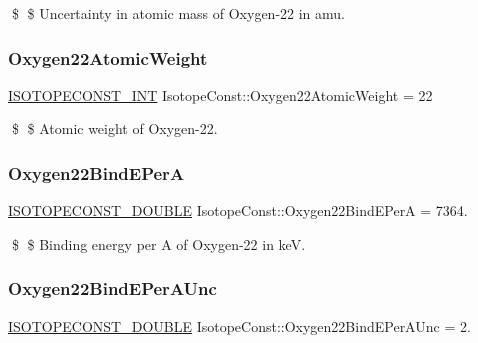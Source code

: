 \$ \$ Uncertainty in atomic mass of Oxygen-\/22 in amu. \mbox{\label{group___isotope_const-_oxygen-_o22_ga62ae155ee6c1689b5ac4e7338f58abd2}} 
\subsubsection{\texorpdfstring{Oxygen22\+Atomic\+Weight}{Oxygen22AtomicWeight}}
{\footnotesize\ttfamily \mbox{\hyperlink{group___isotope_const-_macros_ga5f18360b3e99483a35c32d789e62621c}{I\+S\+O\+T\+O\+P\+E\+C\+O\+N\+S\+T\+\_\+\+I\+NT}} Isotope\+Const\+::\+Oxygen22\+Atomic\+Weight = 22}

\$ \$ Atomic weight of Oxygen-\/22. \mbox{\label{group___isotope_const-_oxygen-_o22_ga26b81d13d47f204d8797848372bf8782}} 
\subsubsection{\texorpdfstring{Oxygen22\+Bind\+E\+PerA}{Oxygen22BindEPerA}}
{\footnotesize\ttfamily \mbox{\hyperlink{group___isotope_const-_macros_ga8f45a7272ce02c0b4c65c44636ed719a}{I\+S\+O\+T\+O\+P\+E\+C\+O\+N\+S\+T\+\_\+\+D\+O\+U\+B\+LE}} Isotope\+Const\+::\+Oxygen22\+Bind\+E\+PerA = 7364.}

\$ \$ Binding energy per A of Oxygen-\/22 in keV. \mbox{\label{group___isotope_const-_oxygen-_o22_ga17a1f8f0dc18285235b6aed2053f900f}} 
\subsubsection{\texorpdfstring{Oxygen22\+Bind\+E\+Per\+A\+Unc}{Oxygen22BindEPerAUnc}}
{\footnotesize\ttfamily \mbox{\hyperlink{group___isotope_const-_macros_ga8f45a7272ce02c0b4c65c44636ed719a}{I\+S\+O\+T\+O\+P\+E\+C\+O\+N\+S\+T\+\_\+\+D\+O\+U\+B\+LE}} Isotope\+Const\+::\+Oxygen22\+Bind\+E\+Per\+A\+Unc = 2.}

